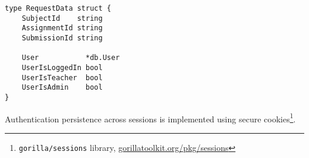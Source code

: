 \lstset{language=Golang,caption=the RequestData struct,label=lst:request-data}
\begin{lstlisting}
type RequestData struct {
	SubjectId    string
	AssignmentId string
	SubmissionId string

	User           *db.User
	UserIsLoggedIn bool
	UserIsTeacher  bool
	UserIsAdmin    bool
}
\end{lstlisting}

Authentication persistence across sessions is implemented using secure cookies\footnote{\texttt{gorilla/sessions} library, \url{gorillatoolkit.org/pkg/sessions}}.

